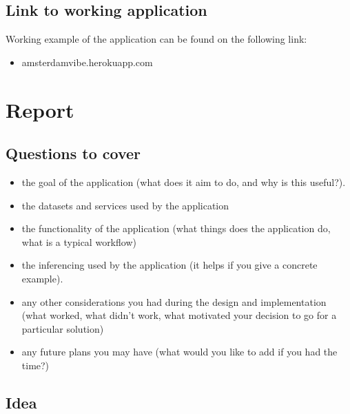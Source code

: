 \documentclass[12pt, a4paper, lithuanian]{article}
\begin{document}
\subsection{Link to working application}

Working example of the application can be found on the following link:

\begin{itemize}

  \item amsterdamvibe.herokuapp.com

\end{itemize}

\section{Report}

\subsection{Questions to cover}

\begin{itemize}
  
    \item the goal of the application (what does it aim to do, and why is this useful?).

    \item the datasets and services used by the application

    \item the functionality of the application (what things does the application do, what is a typical workflow)

    \item the inferencing used by the application (it helps if you give a concrete example).

    \item any other considerations you had during the design and implementation (what worked, what didn't work, what motivated your decision to go for a particular solution)

    \item any future plans you may have (what would you like to add if you had the time?)

\end{itemize}

\subsection{Idea}
\end{document}
